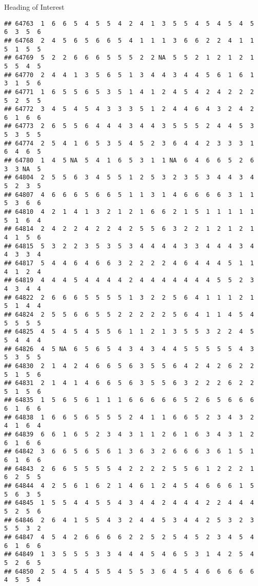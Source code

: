 \documentclass[
  ignorenonframetext,
]{beamer}
\begin{document}
\begin{frame}[fragile]{Heading of Interest}
\begin{verbatim}
## 64763  1  6  6  5  4  5  5  4  2  4  1  3  5  5  4  5  4  5  4  5  6  3  5  6
## 64768  2  4  5  6  5  6  6  5  4  1  1  1  3  6  6  2  2  4  1  1  5  1  5  5
## 64769  5  2  2  6  6  6  5  5  5  2  2 NA  5  5  2  1  2  1  2  1  5  5  4  5
## 64770  2  4  4  1  3  5  6  5  1  3  4  4  3  4  4  5  6  1  6  1  3  1  5  6
## 64771  1  6  5  5  6  5  3  5  1  4  1  2  4  5  4  2  4  2  2  2  5  2  5  5
## 64772  3  4  5  4  5  4  3  3  3  5  1  2  4  4  6  4  3  2  4  2  6  1  6  6
## 64773  2  6  5  5  6  4  4  4  3  4  4  3  5  5  5  2  4  4  5  3  5  3  5  5
## 64774  2  5  4  1  6  5  3  5  4  5  2  3  6  4  4  2  3  3  3  1  6  4  6  5
## 64780  1  4  5 NA  5  4  1  6  5  3  1  1 NA  6  4  6  6  5  2  6  3  3 NA  5
## 64804  2  5  5  6  3  4  5  5  1  2  5  3  2  3  5  3  4  4  3  4  5  2  3  5
## 64807  4  6  6  6  5  6  6  5  1  1  3  1  4  6  6  6  6  3  1  1  5  3  6  6
## 64810  4  2  1  4  1  3  2  1  2  1  6  6  2  1  5  1  1  1  1  1  5  1  6  4
## 64814  2  4  2  2  4  2  2  4  2  5  5  6  3  2  2  1  2  1  2  1  4  1  5  6
## 64815  5  3  2  2  3  5  3  5  3  4  4  4  4  3  3  4  4  4  3  4  4  3  3  4
## 64817  5  4  4  6  4  6  6  3  2  2  2  2  4  6  4  4  4  5  1  1  4  1  2  4
## 64819  4  4  4  5  4  4  4  4  2  4  4  4  4  4  4  4  5  5  2  3  4  3  4  4
## 64822  2  6  6  6  5  5  5  5  1  3  2  2  5  6  4  1  1  1  2  1  5  1  4  4
## 64824  2  5  5  6  6  5  5  2  2  2  2  2  5  6  4  1  1  4  5  4  5  5  5  5
## 64825  4  5  4  5  4  5  5  6  1  1  2  1  3  5  5  3  2  2  4  5  5  4  4  4
## 64826  4  5 NA  6  5  6  5  4  3  4  3  4  4  5  5  5  5  5  4  3  5  3  5  5
## 64830  2  1  4  2  4  6  6  5  6  3  5  5  6  4  2  4  2  6  2  2  5  1  5  6
## 64831  2  1  4  1  4  6  6  5  6  3  5  5  6  3  2  2  2  6  2  2  5  1  5  6
## 64835  1  5  6  5  6  1  1  1  6  6  6  6  6  5  2  6  5  6  6  6  6  1  6  6
## 64838  1  6  6  5  6  5  5  5  2  4  1  1  6  6  5  2  3  4  3  2  4  1  6  4
## 64839  6  6  1  6  5  2  3  4  3  1  1  2  6  1  6  3  4  3  1  2  6  1  6  6
## 64842  3  6  6  5  6  5  6  1  3  6  3  2  6  6  6  3  6  1  5  1  6  1  6  6
## 64843  2  6  6  5  5  5  5  4  2  2  2  2  5  5  6  1  2  2  2  1  6  2  5  5
## 64844  4  2  5  6  1  6  2  1  4  6  1  2  4  5  4  6  6  6  1  5  5  6  3  5
## 64845  1  5  5  4  4  5  5  4  3  4  4  2  4  4  4  2  2  4  4  4  5  2  5  6
## 64846  2  6  4  1  5  5  4  3  2  4  4  5  3  4  4  2  5  3  2  3  5  5  3  2
## 64847  4  5  4  2  6  6  6  6  2  2  5  2  5  4  5  2  3  4  5  4  6  1  6  6
## 64849  1  3  5  5  5  3  3  4  4  4  5  4  6  5  3  1  4  2  5  4  5  2  6  5
## 64850  2  5  4  5  4  5  5  4  5  5  3  6  4  5  4  6  6  6  6  6  4  5  5  4

\end{verbatim}
\end{frame}
\end{document}
